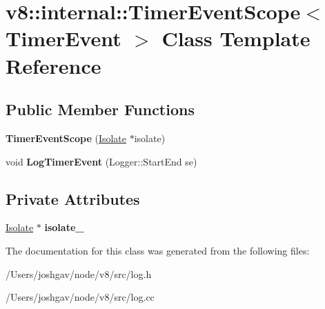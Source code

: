 \hypertarget{classv8_1_1internal_1_1_timer_event_scope}{}\section{v8\+:\+:internal\+:\+:Timer\+Event\+Scope$<$ Timer\+Event $>$ Class Template Reference}
\label{classv8_1_1internal_1_1_timer_event_scope}
\subsection*{Public Member Functions}
\begin{DoxyCompactItemize}
\item 
{\bfseries Timer\+Event\+Scope} (\hyperlink{classv8_1_1internal_1_1_isolate}{Isolate} $\ast$isolate)\hypertarget{classv8_1_1internal_1_1_timer_event_scope_abc9abae0ace69313684ee43d79e7920a}{}\label{classv8_1_1internal_1_1_timer_event_scope_abc9abae0ace69313684ee43d79e7920a}

\item 
void {\bfseries Log\+Timer\+Event} (Logger\+::\+Start\+End se)\hypertarget{classv8_1_1internal_1_1_timer_event_scope_ab4c8e13bd0af2e8329c1d9c7e2d62189}{}\label{classv8_1_1internal_1_1_timer_event_scope_ab4c8e13bd0af2e8329c1d9c7e2d62189}

\end{DoxyCompactItemize}
\subsection*{Private Attributes}
\begin{DoxyCompactItemize}
\item 
\hyperlink{classv8_1_1internal_1_1_isolate}{Isolate} $\ast$ {\bfseries isolate\+\_\+}\hypertarget{classv8_1_1internal_1_1_timer_event_scope_ac2026fb600e3ece0269fa7947fc4d024}{}\label{classv8_1_1internal_1_1_timer_event_scope_ac2026fb600e3ece0269fa7947fc4d024}

\end{DoxyCompactItemize}


The documentation for this class was generated from the following files\+:\begin{DoxyCompactItemize}
\item 
/\+Users/joshgav/node/v8/src/log.\+h\item 
/\+Users/joshgav/node/v8/src/log.\+cc\end{DoxyCompactItemize}

